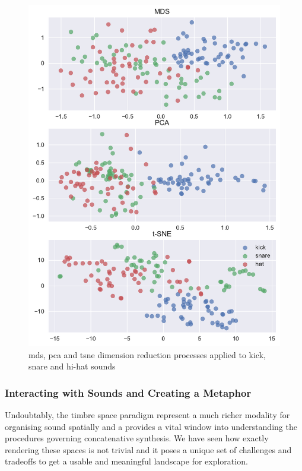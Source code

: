 \begin{figure}
	\begin{center}
		\includegraphics[width=1.0\textwidth]{ch06_rhythmcat/figures/dimension_reductions.pdf}
	\end{center}
	\caption[MDS, PCA and t-SNE Dimension Reduction on Kick,Snare and Hat Sounds]{\acrshort{mds}, \acrshort{pca} and \acrshort{tsne} dimension reduction processes applied to kick, snare and hi-hat sounds}
	\label{fig:dimension_reductions}
\end{figure}

\subsubsection{Interacting with Sounds and Creating a Metaphor}

Undoubtably, the timbre space paradigm represent a much richer modality for organising sound spatially and a provides a vital window into understanding the procedures governing concatenative synthesis. We have seen how exactly rendering these spaces is not trivial and it poses a unique set of challenges and tradeoffs to get a usable and meaningful landscape for exploration.

